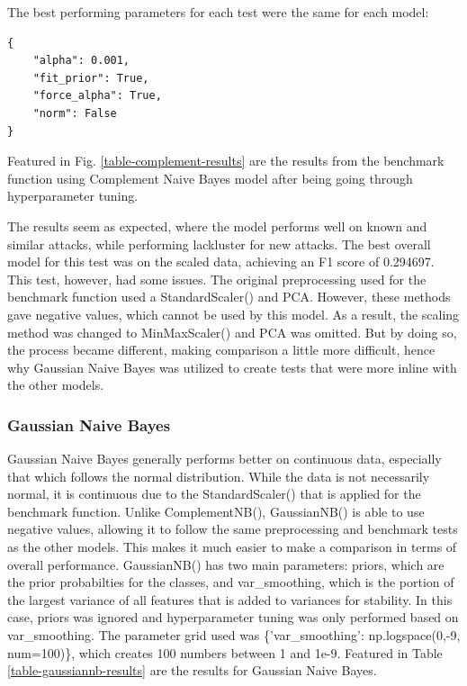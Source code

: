The best performing parameters for each test were the same for each model: 

\begin{lstlisting}
{
    "alpha": 0.001, 
    "fit_prior": True, 
    "force_alpha": True, 
    "norm": False
}
\end{lstlisting}
Featured in Fig. \ref{table-complement-results} are the results from the benchmark function using Complement Naive Bayes model after being going through hyperparameter tuning.



The results seem as expected, where the model performs well on known and similar attacks, while performing lackluster for new attacks. The best overall model for this test was on the scaled data, achieving an F1 score of 0.294697. This test, however, had some issues. The original preprocessing used for the benchmark function used a StandardScaler() and PCA. However, these methods gave negative values, which cannot be used by this model. As a result, the scaling method was changed to MinMaxScaler() and PCA was omitted. But by doing so, the process became different, making comparison a little more difficult, hence why Gaussian Naive Bayes was utilized to create tests that were more inline with the other models.

\subsubsection{Gaussian Naive Bayes}
Gaussian Naive Bayes generally performs better on continuous data, especially that which follows the normal distribution. While the data is not necessarily normal, it is continuous due to the StandardScaler() that is applied for the benchmark function. Unlike ComplementNB(), GaussianNB() is able to use negative values, allowing it to follow the same preprocessing and benchmark tests as the other models. This makes it much easier to make a comparison in terms of overall performance. GaussianNB() has two main parameters: priors, which are the prior probabilties for the classes, and var\_smoothing, which is the portion of the largest variance of all features that is added to variances for stability. In this case, priors was ignored and hyperparameter tuning was only performed based on var\_smoothing. The parameter grid used was \{'var\_smoothing': np.logspace(0,-9, num=100)\}, which creates 100 numbers between 1 and 1e-9. Featured in Table \ref{table-gaussiannb-results} are the results for Gaussian Naive Bayes.

